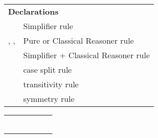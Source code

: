 \begin{isabellebody}
\begin{isamarkuptext}
\begin{tabular}{ll}
    \multicolumn{2}{l}{\textbf{Declarations}} \\[0.5ex]
    \mbox{\isa{simp}} & Simplifier rule \\
    \mbox{\isa{intro}}, \mbox{\isa{elim}}, \mbox{\isa{dest}} & Pure or Classical Reasoner rule \\
    \mbox{\isa{iff}} & Simplifier + Classical Reasoner rule \\
    \mbox{\isa{split}} & case split rule \\
    \mbox{\isa{trans}} & transitivity rule \\
    \mbox{\isa{sym}} & symmetry rule \\
  \end{tabular}%
\end{isamarkuptext}%
\isamarkuptrue%
%
\isamarkuptrue%
%
\begin{isamarkuptext}%
\begin{tabular}{l|lllll}
      & \mbox{\isa{rule}} & \mbox{\isa{iprover}} & \mbox{\isa{blast}} & \mbox{\isa{simp}} & \mbox{\isa{auto}} \\
      &                &                   & \mbox{\isa{fast}} & \mbox{\isa{simp{\isacharunderscore}all}} & \mbox{\isa{force}} \\
    \hline
    \mbox{\isa{Pure{\isachardot}elim}}\isa{{\isachardoublequote}{\isacharbang}{\isachardoublequote}} \mbox{\isa{Pure{\isachardot}intro}}\isa{{\isachardoublequote}{\isacharbang}{\isachardoublequote}}
      & \isa{{\isachardoublequote}{\isasymtimes}{\isachardoublequote}}    & \isa{{\isachardoublequote}{\isasymtimes}{\isachardoublequote}} \\
    \mbox{\isa{Pure{\isachardot}elim}} \mbox{\isa{Pure{\isachardot}intro}}
      & \isa{{\isachardoublequote}{\isasymtimes}{\isachardoublequote}}    & \isa{{\isachardoublequote}{\isasymtimes}{\isachardoublequote}} \\
    \mbox{\isa{elim}}\isa{{\isachardoublequote}{\isacharbang}{\isachardoublequote}} \mbox{\isa{intro}}\isa{{\isachardoublequote}{\isacharbang}{\isachardoublequote}}
      & \isa{{\isachardoublequote}{\isasymtimes}{\isachardoublequote}}    &                    & \isa{{\isachardoublequote}{\isasymtimes}{\isachardoublequote}}          &                     & \isa{{\isachardoublequote}{\isasymtimes}{\isachardoublequote}} \\
    \mbox{\isa{elim}} \mbox{\isa{intro}}
      & \isa{{\isachardoublequote}{\isasymtimes}{\isachardoublequote}}    &                    & \isa{{\isachardoublequote}{\isasymtimes}{\isachardoublequote}}          &                     & \isa{{\isachardoublequote}{\isasymtimes}{\isachardoublequote}} \\

\end{tabular}
\end{isamarkuptext}
\end{isabellebody}
